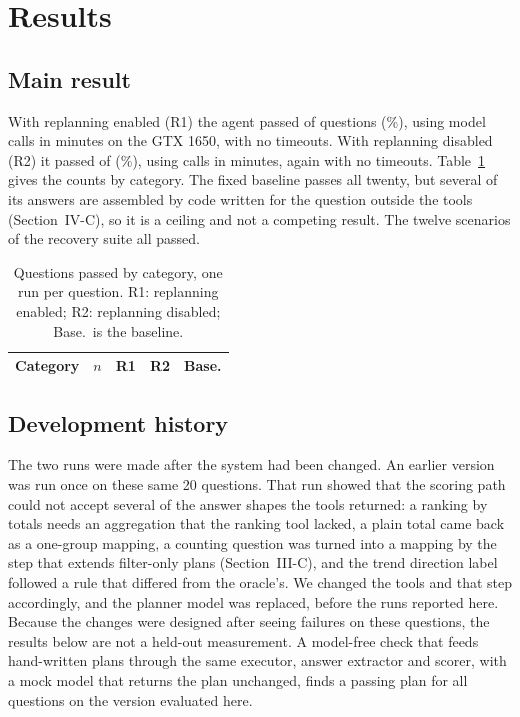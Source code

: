 \section{Results}

\subsection{Main result}
With replanning enabled (R1) the agent passed \MainQ{} of \MainN{} questions (\MainPct\%), using \MainCalls{} model calls in \MainMinutes{} minutes on the GTX 1650, with no timeouts. With replanning disabled (R2) it passed \NoRepQ{} of \NoRepN{} (\NoRepPct\%), using \NoRepCalls{} calls in \NoRepMinutes{} minutes, again with no timeouts. Table~\ref{tab:category} gives the counts by category. The fixed baseline passes all twenty, but several of its answers are assembled by code written for the question outside the tools (Section~IV-C), so it is a ceiling and not a competing result. The twelve scenarios of the recovery suite all passed.

\begin{table}[t]
\caption{Questions passed by category, one run per question. R1: replanning enabled; R2: replanning disabled; Base.\ is the baseline.}
\label{tab:category}
\centering
\footnotesize
\begin{tabular}{lcccc}
\hline
Category & $n$ & R1 & R2 & Base. \\
\hline

\end{tabular}
\end{table}

\subsection{Development history}
The two runs were made after the system had been changed. An earlier version was run once on these same 20 questions. That run showed that the scoring path could not accept several of the answer shapes the tools returned: a ranking by totals needs an aggregation that the ranking tool lacked, a plain total came back as a one-group mapping, a counting question was turned into a mapping by the step that extends filter-only plans (Section~III-C), and the trend direction label followed a rule that differed from the oracle's. We changed the tools and that step accordingly, and the planner model was replaced, before the runs reported here. Because the changes were designed after seeing failures on these questions, the results below are not a held-out measurement. A model-free check that feeds hand-written plans through the same executor, answer extractor and scorer, with a mock model that returns the plan unchanged, finds a passing plan for all \MainReach{} questions on the version evaluated here.

